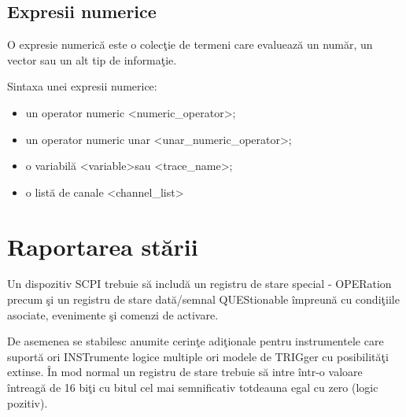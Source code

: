 \subsection{Expresii numerice}
O expresie numeric\u{a} este o colec\c{t}ie de termeni care evalueaz\u{a} un num\u{a}r, un vector sau un alt tip de informa\c{t}ie.

Sintaxa unei expresii numerice:
\begin{itemize}
	\item un operator numeric \textless numeric\_operator\textgreater;
	\item un operator numeric unar \textless unar\_numeric\_operator\textgreater;
	\item o variabil\u{a} \textless variable\textgreater sau \textless trace\_name\textgreater;
	\item o list\u{a} de canale \textless channel\_list\textgreater
\end{itemize}

\section{Raportarea st\u{a}rii}
Un dispozitiv SCPI trebuie s\u{a} includ\u{a} un registru de stare special - OPERation precum \c{s}i un registru de stare dat\u{a}/semnal QUEStionable \^{i}mpreun\u{a} cu condi\c{t}iile asociate, evenimente \c{s}i comenzi de activare.

De asemenea se stabilesc anumite cerin\c{t}e adi\c{t}ionale pentru instrumentele care suport\u{a} ori INSTrumente logice multiple ori modele de TRIGger cu posibilit\u{a}\c{t}i extinse. \^{I}n mod normal un registru de stare trebuie s\u{a} intre \^{i}ntr-o valoare \^{i}ntreag\u{a} de 16 bi\c{t}i cu bitul cel mai semnificativ totdeauna egal cu zero (logic pozitiv).
